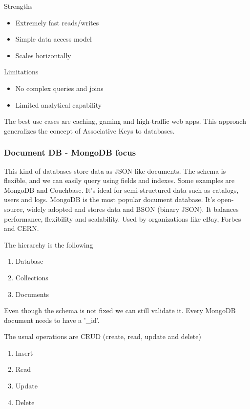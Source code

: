 Strengths
\begin{itemize}
    \item Extremely fast reads/writes
    \item Simple data access model
    \item Scales horizontally
\end{itemize}

Limitations
\begin{itemize}
    \item No complex queries and joins
    \item Limited analytical capability
\end{itemize}

The best use cases are caching, gaming and high-traffic web apps. This approach generalizes the concept of Associative Keys to databases.




\subsubsection{Document DB - MongoDB focus}

This kind of databases store data as JSON-like documents. The schema is flexible, and we can easily query using fields and indexes. Some examples are MongoDB and Couchbase. It's ideal for semi-structured data such as catalogs, users and logs. MongoDB is the most popular document database. It's open-source, widely adopted and stores data and BSON (binary JSON). It balances performance, flexibility and scalability. Used by organizations like eBay, Forbes and CERN. 

\vspace{10pt}

The hierarchy is the following
\begin{enumerate}
    \item Database
    \item Collections
    \item Documents
\end{enumerate}

Even though the schema is not fixed we can still validate it. Every MongoDB document needs to have a '\_id'.

\vspace{10pt}

The usual operations are CRUD (create, read, update and delete)
\begin{enumerate}
    \item Insert
    \item Read
    \item Update
    \item Delete
\end{enumerate}

